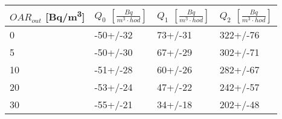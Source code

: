 \begin{tabular}{llll}
\toprule
$OAR_{out}$ [\si{Bq/m^3}] & $Q_0$ $\left[\si{\frac{Bq}{m^3\cdot hod}}\right]$ & $Q_1$ $\left[\si{\frac{Bq}{m^3\cdot hod}}\right]$ & $Q_2$ $\left[\si{\frac{Bq}{m^3\cdot hod}}\right]$ \\
\midrule
0  &                                          -50+/-32 &                                           73+/-31 &                                          322+/-76 \\
5  &                                          -50+/-30 &                                           67+/-29 &                                          302+/-71 \\
10 &                                          -51+/-28 &                                           60+/-26 &                                          282+/-67 \\
20 &                                          -53+/-24 &                                           47+/-22 &                                          242+/-57 \\
30 &                                          -55+/-21 &                                           34+/-18 &                                          202+/-48 \\
\bottomrule
\end{tabular}
